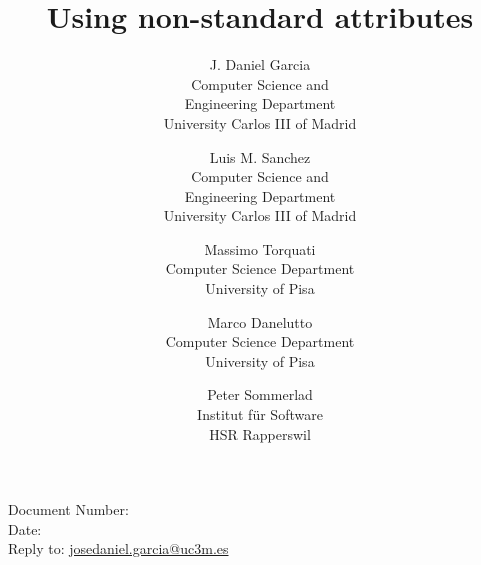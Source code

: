 \documentclass[10pt,a4paper,oneside,final,notitlepage]{article}%
\begin{document}


\begin{flushright}
Document Number: \texttt{\paperid}\\
Date: \paperdate\\
Reply to: \url{josedaniel.garcia@uc3m.es}
\end{flushright}

\title{Using non-standard attributes}
\author{J. Daniel Garcia\\
Computer Science and\\ Engineering Department\\
University Carlos III of Madrid
\and
Luis M. Sanchez\\
Computer Science and\\ Engineering Department\\
University Carlos III of Madrid
\and
Massimo Torquati\\
Computer Science Department\\
University of Pisa
\and
Marco Danelutto\\
Computer Science Department\\
University of Pisa
\and
Peter Sommerlad\\
Institut f\"{u}r Software\\
HSR Rapperswil
}
\date{}

\begingroup
\let\newpage\relax%
\maketitle
\endgroup









\end{document}
